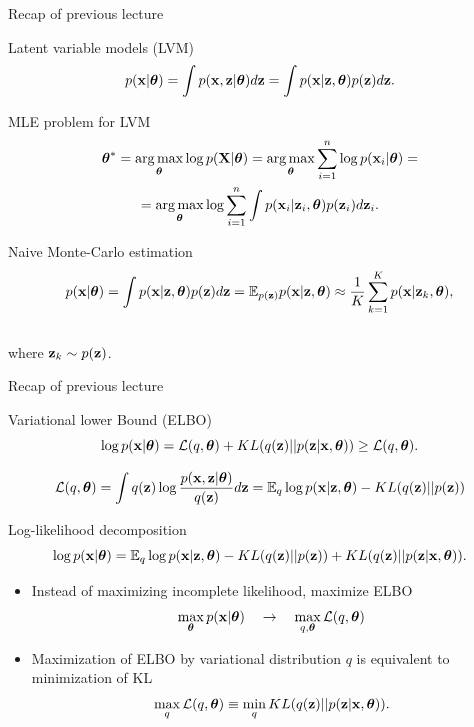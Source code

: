 \begin{frame}{Recap of previous lecture}
	\begin{block}{Latent variable models (LVM)}
		\vspace{-0.3cm}
		\[
		p(\mathbf{x} | \boldsymbol{\theta}) = \int p(\mathbf{x}, \mathbf{z} | \boldsymbol{\theta}) d\mathbf{z} = \int p(\mathbf{x} | \mathbf{z}, \boldsymbol{\theta}) p(\mathbf{z}) d\mathbf{z}.
		\]
	\end{block}
	\begin{block}{MLE problem for LVM}
		\vspace{-0.7cm}
		\begin{multline*}
			\boldsymbol{\theta}^* = \operatorname*{arg\,max}_{\boldsymbol{\theta}} \log p(\mathbf{X}| \boldsymbol{\theta}) = \operatorname*{arg\,max}_{\boldsymbol{\theta}} \sum_{i=1}^n \log p(\mathbf{x}_i | \boldsymbol{\theta}) = \\ = \operatorname*{arg\,max}_{\boldsymbol{\theta}} \log \sum_{i=1}^n \int p(\mathbf{x}_i| \mathbf{z}_i, \boldsymbol{\theta}) p(\mathbf{z}_i) d\mathbf{z}_i.
		\end{multline*}
		\vspace{-0.7cm}
	\end{block}
	\begin{block}{Naive Monte-Carlo estimation}
		\vspace{-0.7cm}
		\[
		p(\mathbf{x} | \boldsymbol{\theta}) = \int p(\mathbf{x} | \mathbf{z}, \boldsymbol{\theta}) p(\mathbf{z}) d\mathbf{z} = \mathbb{E}_{p(\mathbf{z})} p(\mathbf{x} | \mathbf{z}, \boldsymbol{\theta}) \approx \frac{1}{K} \sum_{k=1}^{K} p(\mathbf{x} | \mathbf{z}_k, \boldsymbol{\theta}),
		\]
		\vspace{-0.5cm} \\
		where $\mathbf{z}_k \sim p(\mathbf{z})$. 
	\end{block}
\end{frame}
\begin{frame}{Recap of previous lecture}
	\begin{block}{Variational lower Bound (ELBO)}
		\vspace{-0.3cm}
		\[
			\log p(\mathbf{x}| \boldsymbol{\theta}) = \mathcal{L} (q, \boldsymbol{\theta}) + KL(q(\mathbf{z}) || p(\mathbf{z}|\mathbf{x}, \boldsymbol{\theta})) \geq \mathcal{L} (q, \boldsymbol{\theta}).
		\]
	\end{block}
	
	\vspace{-0.5cm}
	\[
	 \mathcal{L} (q, \boldsymbol{\theta}) = \int q(\mathbf{z}) \log \frac{p(\mathbf{x}, \mathbf{z} | \boldsymbol{\theta})}{q(\mathbf{z})}d\mathbf{z} = \mathbb{E}_{q} \log p(\mathbf{x} | \mathbf{z}, \boldsymbol{\theta}) - KL (q(\mathbf{z}) || p(\mathbf{z}))
	\]
	\vspace{-0.3cm}
	\begin{block}{Log-likelihood decomposition}
		\vspace{-0.5cm}
		\[
		 \log p(\mathbf{x}| \boldsymbol{\theta}) = \mathbb{E}_{q} \log p(\mathbf{x} | \mathbf{z}, \boldsymbol{\theta}) - KL (q(\mathbf{z}) || p(\mathbf{z})) + KL(q(\mathbf{z}) || p(\mathbf{z}|\mathbf{x}, \boldsymbol{\theta})).
		\]
	\end{block}
	\begin{itemize}
	\item Instead of maximizing incomplete likelihood, maximize ELBO
   	\[
  \max_{\boldsymbol{\theta}} p(\mathbf{x} | \boldsymbol{\theta}) \quad \rightarrow \quad \max_{q, \boldsymbol{\theta}} \mathcal{L} (q, \boldsymbol{\theta})
   	\]
   	\item Maximization of ELBO by variational distribution $q$ is equivalent to minimization of KL
  	\[
  \max_q \mathcal{L} (q, \boldsymbol{\theta}) \equiv \min_q KL(q(\mathbf{z}) || p(\mathbf{z}|\mathbf{x}, \boldsymbol{\theta})).
  	\]
  	\end{itemize}
		   	    
\end{frame}
